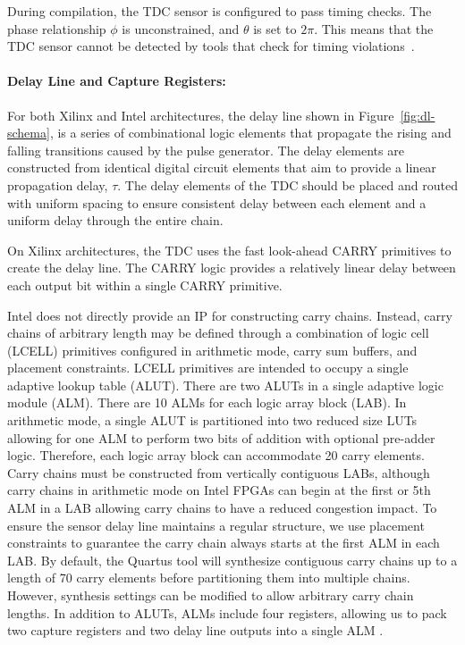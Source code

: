 During compilation, the TDC sensor is configured to pass timing checks. The phase relationship $\phi$ is unconstrained, and $\theta$ is set to $2\pi$. This means that the TDC sensor cannot be detected by tools that check for timing violations~\cite{krautter2019mitigating}.

\paragraph{Delay Line and Capture Registers: }
\label{delay_line}
For both Xilinx and Intel architectures, the delay line shown in Figure~\ref{fig:dl-schema}, is a series of combinational logic elements that propagate the rising and falling transitions caused by the pulse generator.
The delay elements are constructed from identical digital circuit elements that aim to provide a linear propagation delay, $\tau$.
The delay elements of the TDC should be placed and routed with uniform spacing to ensure consistent delay between each element and a uniform delay through the entire chain.

On Xilinx architectures, the \name TDC uses the fast look-ahead CARRY primitives to create the delay line. The CARRY logic provides a relatively linear delay between each output bit within a single CARRY primitive. 

Intel does not directly provide an IP for constructing carry chains. Instead, carry chains of arbitrary length may be defined through a combination of logic cell (LCELL) primitives configured in arithmetic mode, carry sum buffers, and placement constraints. LCELL primitives are intended to occupy a single adaptive lookup table (ALUT). There are two ALUTs in a single adaptive logic module (ALM). There are 10 ALMs for each logic array block (LAB).  In arithmetic mode, a single ALUT is partitioned into two reduced size LUTs allowing for one ALM to perform two bits of addition with optional pre-adder logic. Therefore, each logic array block can accommodate 20 carry elements. Carry chains must be constructed from vertically contiguous LABs, although carry chains in arithmetic mode on Intel FPGAs can begin at the first or 5th ALM in a LAB allowing carry chains to have a reduced congestion impact. To ensure the sensor delay line maintains a regular structure, we use placement constraints to guarantee the carry chain always starts at the first ALM in each LAB. By default, the Quartus tool will synthesize contiguous carry chains up to a length of 70 carry elements before partitioning them into multiple chains. However, synthesis settings can be modified to allow arbitrary carry chain lengths. In addition to ALUTs, ALMs include four registers, allowing us to pack two capture registers and two delay line outputs into a single ALM \cite{intel_carry-chain}.

